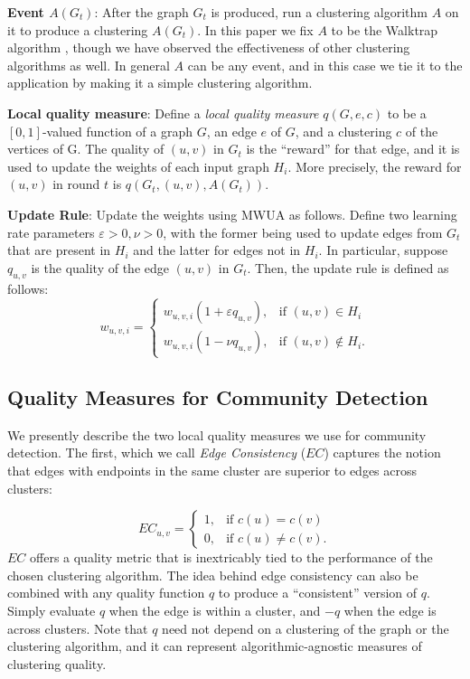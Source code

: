 \documentclass{article}
\begin{document}
\textbf{Event $A(G_t)$}: After the graph $G_t$ is produced, run a clustering
algorithm $A$ on it to produce a clustering $A(G_t)$. In this paper we fix $A$
to be the Walktrap algorithm \cite{Walktrap}, though we have observed the
effectiveness of other clustering algorithms as well. In general $A$ can be any
event, and in this case we tie it to the application by making it a simple
clustering algorithm.

\textbf{Local quality measure}: Define a \emph{local quality measure}
$q(G,e,c)$ to be a $[0,1]$-valued function of a graph $G$, an edge $e$ of $G$,
and a clustering $c$ of the vertices of G. The quality of $(u,v)$ in $G_t$ is
the ``reward'' for that edge, and it is used to update the weights of each
input graph $H_i$.  More precisely, the reward for $(u,v)$ in round $t$ is
$q(G_t, (u,v),A(G_t))$.

\textbf{Update Rule}: Update the weights using MWUA as follows. Define two
learning rate parameters $\varepsilon > 0, \nu > 0$, with the former being used
to update edges from $G_t$ that are present in $H_i$ and the latter for edges
not in $H_i$. In particular, suppose $q_{u,v}$ is the quality of the edge
$(u,v)$ in $G_t$. Then, the update rule is defined as follows:
\[
w_{u,v,i}=
\begin{cases}
w_{u,v,i}(1 +\varepsilon q_{u,v}), & \text{if } (u,v) \in H_i \\
w_{u,v,i}(1 - \nu q_{u,v}), & \text{if } (u,v) \not \in H_i .
\end{cases}
\]
 
\subsection{Quality Measures for Community Detection}
\label{sec:quality-measures}
We presently describe the two local quality measures we use for community
detection. The first, which we call {\em Edge Consistency} ($EC$) captures the
notion that edges with endpoints in the same cluster are superior to edges
across clusters:

\[
   EC_{u,v}=
   \begin{cases}
   1, & \text{if  }c(u) = c(v) \\
   0,  & \text{if  }c(u) \neq c(v).
   \end{cases}
\]
$EC$ offers a quality metric that is inextricably tied to the performance of
the chosen clustering algorithm.  The idea behind edge consistency can also be
combined with any quality function $q$ to produce a ``consistent'' version of
$q$. Simply evaluate $q$ when the edge is within a cluster, and $-q$ when the
edge is across clusters. Note that $q$ need not depend on a clustering of the
graph or the clustering algorithm, and it can represent algorithmic-agnostic
measures of clustering quality.
\end{document}
